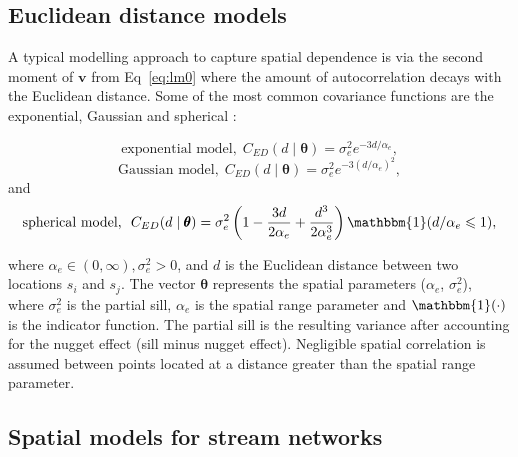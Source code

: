 \subsection*{Euclidean distance models}

A typical modelling approach to capture spatial dependence is via the second moment of $\pmb{v}$ from Eq~\ref{eq:lm0} where the amount of autocorrelation decays with the Euclidean distance. 
Some of the most common covariance functions are the exponential, Gaussian and spherical \citep{cressie2015statistics, banerjee2014hierarchical}: 


\begin{equation}
    \textrm{exponential model,} \ \  C_{ED}(d\mid \pmb{\theta}) = \sigma_e^2 e^{-3d/\alpha_e},
    \label{eq:ced}
\end{equation}
\begin{equation}
    \textrm{Gaussian model,} \ \ C_{ED}(d\mid \pmb{\theta}) = \sigma_e^2 e^{-3(d/\alpha_e)^2},
\label{eq:ced2}
\end{equation}
and
\begin{equation}
\textrm{spherical model,} \ \ C_{ED}(d\mid \pmb{\theta}) = \sigma_e^2\left(1-\frac{3d}{2\alpha_e} + \frac{d^3}{2\alpha_e^3}\right)\mathbbm{1}(d/\alpha_e \leqslant 1),
\label{eq:ced3}
\end{equation}


\noindent where $\alpha_e \in (0,\infty), \sigma_e ^ 2 > 0$, and $d$ is the Euclidean distance between two locations $s_i$ and $s_j$.
The vector $\pmb{\theta}$ represents the spatial parameters ($\alpha_e$, $\sigma_e^2$), where 
$\sigma_e^2$ is the partial sill, $\alpha_e$ is the spatial range parameter and $\mathbbm{1}(\cdot)$ is the indicator function. 
The partial sill is the resulting variance after accounting for the nugget effect (sill minus nugget effect).
Negligible spatial correlation is assumed between points located at a distance greater than the spatial range parameter.  



\subsection{Spatial models for stream networks}

